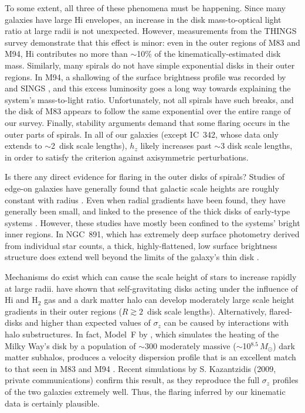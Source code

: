 \documentclass[12pt,preprint]{emulateapj}
\newcommand{\eg}{{e.g.,}}
\begin{document}
To some extent, all three of these phenomena must be happening.  Since many galaxies have large H{\sc i} envelopes, an increase in the disk mass-to-optical light ratio at large radii is not unexpected.  However, measurements from the THINGS survey \citep{THINGS} demonstrate that this effect is minor:  even in the outer regions of M83 and M94, H{\sc i} contributes no more than $\sim$10\% of the kinematically-estimated disk mass.   Similarly, many spirals do not have simple exponential disks in their outer regions.  In M94, a shallowing of the surface brightness profile was recorded by \citet{g+09} and SINGS \citep{dB+08}, and this excess luminosity goes a long way towards explaining the system's mass-to-light ratio.  Unfortunately, not all spirals have such breaks, and the disk of M83 appears to follow the same exponential over the entire range of our survey.   Finally, stability arguments demand that some flaring occurs in the outer parts of spirals.   In all of our galaxies (except IC~342, whose data only extends to $\sim$2~disk scale lengths), $h_z$ likely increases past $\sim$3 disk scale lengths, in order to satisfy the \citet{t64} criterion against axisymmetric perturbations.

Is there any direct evidence for flaring in the outer disks of spirals?  Studies of edge-on galaxies have generally found that galactic scale heights are roughly constant with radius \citep[\eg][]{vdKs82, bm02}.  Even when radial gradients have been found, they have generally been small, and linked to the presence of the thick disks of early-type systems \citep{dGP97}.  However, these studies have mostly been confined to the systems' bright inner regions.  In NGC~891, which has extremely deep surface photometry derived from individual star counts, a thick, highly-flattened, low surface brightness structure does extend well beyond the limits of the galaxy's thin disk \citep{mouhcine}.

Mechanisms do exist which can cause the scale height of stars to increase rapidly at large radii.  \citet{nj02} have shown that self-gravitating disks acting under the influence of H{\sc i} and H$_2$ gas and a dark matter halo can develop moderately large scale height gradients in their outer regions ($R \gtrsim 2$~disk scale lengths).  Alternatively, flared-disks and higher than expected values of $\sigma_z$ can be caused by interactions with halo substructures.  In fact, Model~F by \citet{hc06}, which simulates the heating of the Milky Way's disk by a population of $\sim$300 moderately massive ($\sim$10$^{8.5} \, M_{\odot}$) dark matter subhalos, produces a velocity dispersion profile that is an excellent match to that seen in M83 and M94 \citep{Letter}.  Recent simulations by S. Kazantzidis (2009, private communications) confirm this result, as they reproduce the full $\sigma_z$ profiles of the two galaxies extremely well.  Thus, the flaring inferred by our kinematic data is certainly plausible.
\end{document}
